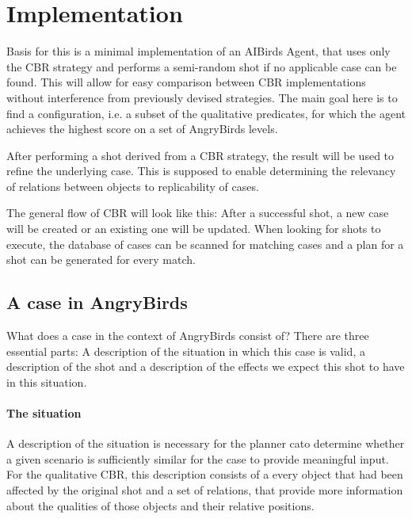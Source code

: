 \section{Implementation}\label{sec:implementation}

Basis for this is a minimal implementation of an AIBirds Agent, that uses only the CBR strategy and performs a semi-random shot if no applicable case can be found.
This will allow for easy comparison between CBR implementations without interference from previously devised strategies.
The main goal here is to find a configuration, i.e. a subset of the qualitative predicates, for which the agent achieves the highest score on a set of AngryBirds levels.

After performing a shot derived from a CBR strategy, the result will be used to refine the underlying case.
This is supposed to enable determining the relevancy of relations between objects to replicability of cases.

The general flow of CBR will look like this: After a successful shot, a new case will be created or an existing one will be updated. When looking for shots to execute, the database of cases can be scanned for matching cases and a plan for a shot can be generated for every match.


\subsection{A case in AngryBirds}\label{subsec:impl-case}
What does a case in the context of AngryBirds consist of? There are three essential parts: A description of the situation in which this case is valid, a description of the shot and a description of the effects we expect this shot to have in this situation.

\paragraph{The situation}
A description of the situation is necessary for the planner cato determine whether a given scenario is sufficiently similar for the case to provide meaningful input.
For the qualitative CBR, this description consists of a every object that had been affected by the original shot and a set of relations, that provide more information about the qualities of those objects and their relative positions.


